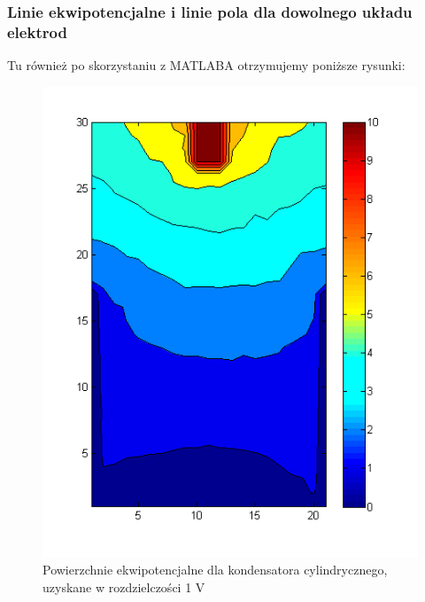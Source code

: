 \documentclass{article}
\begin{document}
\subsubsection{Linie ekwipotencjalne i linie pola dla dowolnego układu elektrod}

Tu również po skorzystaniu z MATLABA otrzymujemy poniższe rysunki:
\begin{figure}[h!]
	\centering
	\includegraphics[scale=0.4]{duzycontourmap}
	\caption{Powierzchnie ekwipotencjalne dla kondensatora cylindrycznego, uzyskane w rozdzielczości 1 V}
\end{figure}
\end{document}
